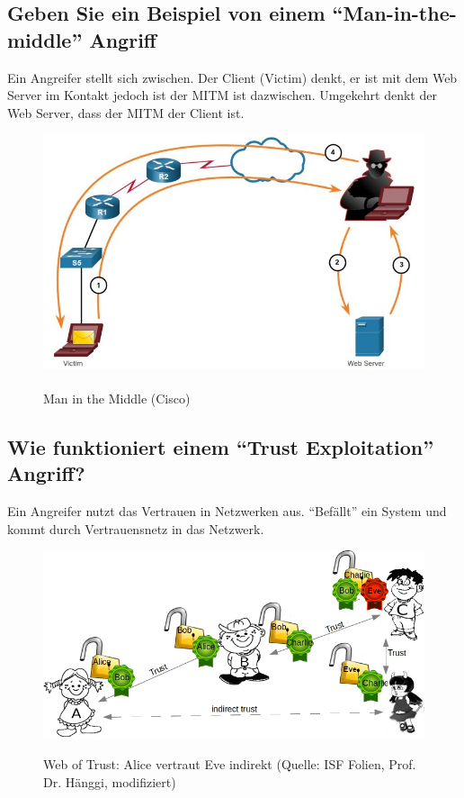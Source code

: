 \subsection*{Geben Sie ein Beispiel von einem "`Man-in-the-middle"' Angriff}
Ein Angreifer stellt sich zwischen. Der Client (Victim) denkt, er ist mit dem Web Server im Kontakt jedoch ist der MITM ist dazwischen. Umgekehrt denkt der Web Server, dass der MITM der Client ist.
\begin{figure}[H]
    \begin{center}
    \label{pic:MITM}
    \includegraphics[width=\textwidth]{images/mitm.jpg}
    \caption{Man in the Middle (\textsuperscript{\textcopyright}Cisco)}
    \end{center}
\end{figure}

\subsection*{Wie funktioniert einem "`Trust Exploitation"' Angriff?}
Ein Angreifer nutzt das Vertrauen in Netzwerken aus. "`Befällt"' ein System und kommt durch Vertrauensnetz in das Netzwerk.

\begin{figure}[H]
    \begin{center}
    \label{pic:WOT}
    \includegraphics[width=\textwidth]{images/WOT.png}
    \caption{Web of Trust: Alice vertraut Eve indirekt (Quelle: ISF Folien, Prof. Dr. Hänggi, modifiziert)}
    \end{center}
\end{figure}

